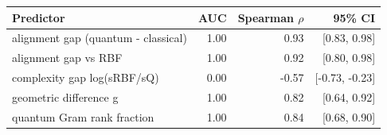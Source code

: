 \begin{tabular}{lrrr}
\toprule
Predictor & AUC & Spearman $\rho$ & 95\% CI \\
\midrule
alignment gap (quantum - classical) & 1.00 & 0.93 & [0.83, 0.98] \\
alignment gap vs RBF & 1.00 & 0.92 & [0.80, 0.98] \\
complexity gap log(sRBF/sQ) & 0.00 & -0.57 & [-0.73, -0.23] \\
geometric difference g & 1.00 & 0.82 & [0.64, 0.92] \\
quantum Gram rank fraction & 1.00 & 0.84 & [0.68, 0.90] \\
\bottomrule
\end{tabular}
